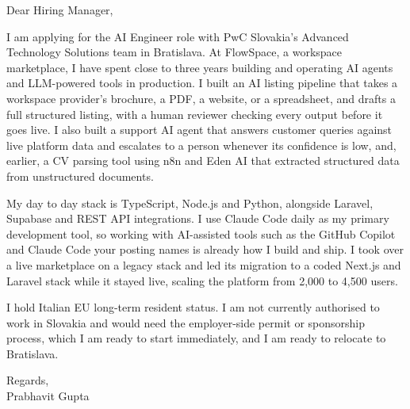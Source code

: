 \documentclass[a4paper,11pt]{article}
\begin{document}
Dear Hiring Manager,

I am applying for the AI Engineer role with PwC Slovakia's Advanced Technology Solutions team in Bratislava. At FlowSpace, a workspace marketplace, I have spent close to three years building and operating AI agents and LLM-powered tools in production. I built an AI listing pipeline that takes a workspace provider's brochure, a PDF, a website, or a spreadsheet, and drafts a full structured listing, with a human reviewer checking every output before it goes live. I also built a support AI agent that answers customer queries against live platform data and escalates to a person whenever its confidence is low, and, earlier, a CV parsing tool using n8n and Eden AI that extracted structured data from unstructured documents.

My day to day stack is TypeScript, Node.js and Python, alongside Laravel, Supabase and REST API integrations. I use Claude Code daily as my primary development tool, so working with AI-assisted tools such as the GitHub Copilot and Claude Code your posting names is already how I build and ship. I took over a live marketplace on a legacy stack and led its migration to a coded Next.js and Laravel stack while it stayed live, scaling the platform from 2,000 to 4,500 users.

I hold Italian EU long-term resident status. I am not currently authorised to work in Slovakia and would need the employer-side permit or sponsorship process, which I am ready to start immediately, and I am ready to relocate to Bratislava.

Regards,\\
Prabhavit Gupta
\end{document}
